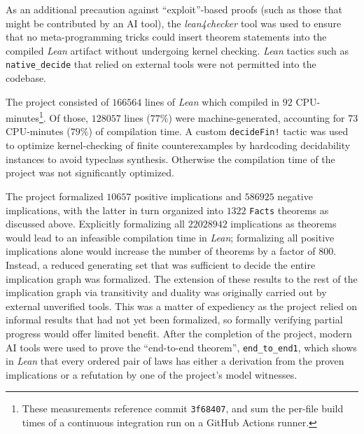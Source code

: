 As an additional precaution against ``exploit''-based proofs (such as those that might be contributed by an AI tool), the \emph{lean4checker} tool was used to ensure that no meta-programming tricks could insert theorem statements into the compiled \emph{Lean} artifact without undergoing kernel checking.  \emph{Lean} tactics such as \texttt{native\_decide} that relied on external tools were not permitted into the codebase.

The project consisted of $\num{166564}$ lines of \emph{Lean} which compiled in $92$ CPU-minutes\footnote{These measurements reference commit \texttt{3f68407}, and sum the per-file build times of a continuous integration run on a GitHub Actions runner.}.  Of those, $\num{128057}$ lines ($77\%$) were machine-generated, accounting for $73$ CPU-minutes ($79\%$) of compilation time.  A custom \texttt{decideFin!} tactic was used to optimize kernel-checking of finite counterexamples by hardcoding decidability instances to avoid typeclass synthesis.  Otherwise the compilation time of the project was not significantly optimized.

The project formalized $\num{10657}$ positive implications and $\num{586925}$ negative implications, with the latter in turn organized into $\num{1322}$ \texttt{Facts} theorems as discussed above.  Explicitly formalizing all $\num{22028942}$ implications as theorems would lead to an infeasible compilation time in \emph{Lean}; formalizing all positive implications alone would increase the number of theorems by a factor of $800$.  Instead, a reduced generating set that was sufficient to decide the entire implication graph was formalized.  The extension of these results to the rest of the implication graph via transitivity and duality was originally carried out by external unverified tools.  This was a matter of expediency as the project relied on informal results that had not yet been formalized, so formally verifying partial progress would offer limited benefit.  After the completion of the project, modern AI tools were used to prove the ``end-to-end theorem'', \texttt{end\_to\_end1}, which shows in \emph{Lean} that every ordered pair of laws has either a derivation from the proven implications or a refutation by one of the project's model witnesses.

